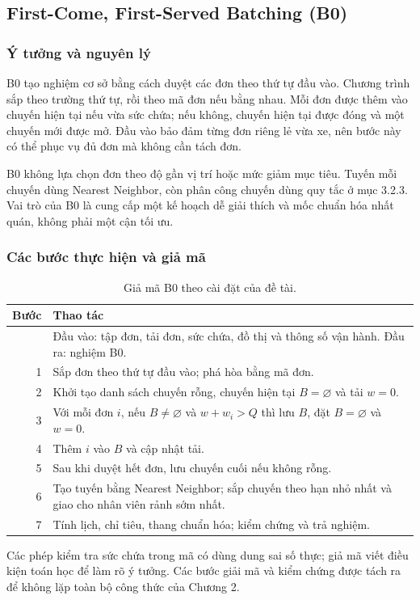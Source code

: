 \subsection[First-Come, First-Served Batching]{First-Come, First-Served Batching (B0)}

\subsubsection{Ý tưởng và nguyên lý}
B0 tạo nghiệm cơ sở bằng cách duyệt các đơn theo thứ tự đầu vào. Chương trình sắp theo trường thứ tự, rồi theo mã đơn nếu bằng nhau. Mỗi đơn được thêm vào chuyến hiện tại nếu vừa sức chứa; nếu không, chuyến hiện tại được đóng và một chuyến mới được mở. Đầu vào bảo đảm từng đơn riêng lẻ vừa xe, nên bước này có thể phục vụ đủ đơn mà không cần tách đơn.

B0 không lựa chọn đơn theo độ gần vị trí hoặc mức giảm mục tiêu. Tuyến mỗi chuyến dùng Nearest Neighbor, còn phân công chuyến dùng quy tắc ở mục 3.2.3. Vai trò của B0 là cung cấp một kế hoạch dễ giải thích và mốc chuẩn hóa nhất quán, không phải một cận tối ưu.

\subsubsection{Các bước thực hiện và giả mã}
\begin{table}[H]
\centering\small
\begin{tabularx}{\linewidth}{rX}
\toprule
Bước & Thao tác \\
\midrule
 & Đầu vào: tập đơn, tải đơn, sức chứa, đồ thị và thông số vận hành. Đầu ra: nghiệm B0. \\
1 & Sắp đơn theo thứ tự đầu vào; phá hòa bằng mã đơn. \\
2 & Khởi tạo danh sách chuyến rỗng, chuyến hiện tại $B=\varnothing$ và tải $w=0$. \\
3 & Với mỗi đơn $i$, nếu $B\neq\varnothing$ và $w+w_i>Q$ thì lưu $B$, đặt $B=\varnothing$ và $w=0$. \\
4 & Thêm $i$ vào $B$ và cập nhật tải. \\
5 & Sau khi duyệt hết đơn, lưu chuyến cuối nếu không rỗng. \\
6 & Tạo tuyến bằng Nearest Neighbor; sắp chuyến theo hạn nhỏ nhất và giao cho nhân viên rảnh sớm nhất. \\
7 & Tính lịch, chỉ tiêu, thang chuẩn hóa; kiểm chứng và trả nghiệm. \\
\bottomrule
\end{tabularx}
\caption{Giả mã B0 theo cài đặt của đề tài.}\label{tab:b0-pseudocode}
\end{table}
Các phép kiểm tra sức chứa trong mã có dùng dung sai số thực; giả mã viết điều kiện toán học để làm rõ ý tưởng. Các bước giải mã và kiểm chứng được tách ra để không lặp toàn bộ công thức của Chương 2.

